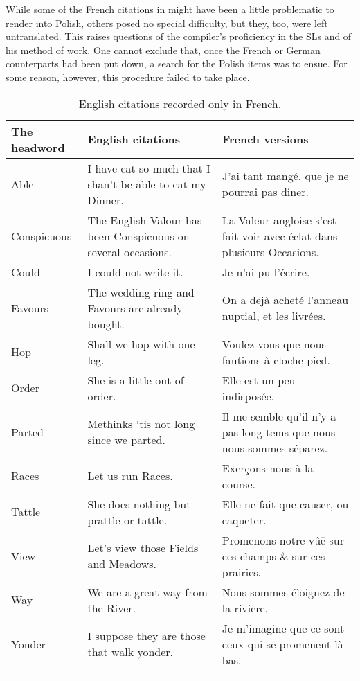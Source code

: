 \documentclass[output=paper,colorlinks,citecolor=brown,arabicfont,chinesefont]{langscibook}
\begin{document}
While some of the French citations in  might have been a little problematic to render into Polish, others posed no special difficulty, but they, too, were left untranslated. This raises questions of the compiler’s proficiency in the SLs and of his method of work. One cannot exclude that, once the French or German counterparts had been put down, a search for the Polish items was to ensue. For some reason, however, this procedure failed to take place.

\begin{table}
\caption{English citations recorded only in French.}
\label{tab:podhajecka:3}
\begin{tabularx}{\linewidth}{ lQQ }
\lsptoprule
The headword & English citations & French versions \\\midrule
Able & I have eat so much that I shan’t be able to eat my Dinner. & J'ai tant mangé, que je ne pourrai pas diner. \\
Conspicuous & The English Valour has been Conspicuous on several occasions. & La Valeur angloise s'est fait voir avec éclat dans plusieurs Occasions. \\
Could & I could not write it. & Je n'ai pu l'écrire. \\
Favours & The wedding ring and Favours are already bought. & On a dejà acheté l'anneau nuptial, et les livrées. \\
Hop & Shall we hop with one leg. & Voulez-vous que nous fautions à cloche pied. \\
Order & She is a little out of order. & Elle est un peu indisposée. \\
Parted & Methinks ‘tis not long since we parted. & Il me semble qu'il n'y a pas long-tems que nous nous sommes séparez. \\
Races & Let us run Races. & Exerçons-nous à la course. \\
Tattle & She does nothing but prattle or tattle. & Elle ne fait que causer, ou caqueter. \\
View & Let’s view those Fields and Meadows. & Promenons notre vûë sur ces champs \& sur ces prairies. \\
Way & We are a great way from the River. & Nous sommes éloignez de la riviere. \\
Yonder & I suppose they are those that walk yonder. & Je m'imagine que ce sont ceux qui se promenent là-bas. \\
\lspbottomrule
\end{tabularx}
\end{table}
\end{document}
